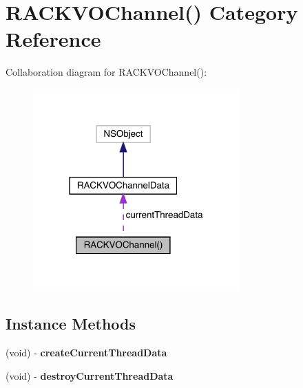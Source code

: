 \hypertarget{category_r_a_c_k_v_o_channel_07_08}{}\section{R\+A\+C\+K\+V\+O\+Channel() Category Reference}
\label{category_r_a_c_k_v_o_channel_07_08}


Collaboration diagram for R\+A\+C\+K\+V\+O\+Channel()\+:\nopagebreak
\begin{figure}[H]
\begin{center}
\leavevmode
\includegraphics[width=225pt]{category_r_a_c_k_v_o_channel_07_08__coll__graph}
\end{center}
\end{figure}
\subsection*{Instance Methods}
\begin{DoxyCompactItemize}
\item 
\mbox{\label{category_r_a_c_k_v_o_channel_07_08_a755207bfe4c3be31c3bbf0ab7165434e}} 
(void) -\/ {\bfseries create\+Current\+Thread\+Data}
\item 
\mbox{\label{category_r_a_c_k_v_o_channel_07_08_a6edcb77a096561e1062889a2996b87a7}} 
(void) -\/ {\bfseries destroy\+Current\+Thread\+Data}
\end{DoxyCompactItemize}
